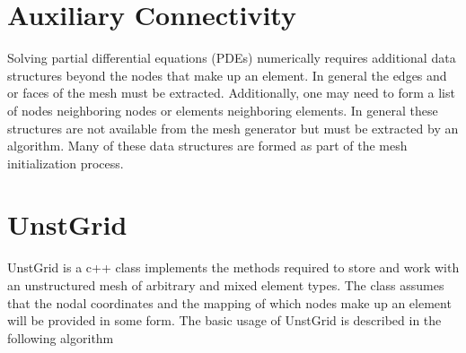 \documentclass[letterpaper]{article}
\begin{document}
\section{Auxiliary Connectivity}
Solving partial differential equations (PDEs) numerically requires additional data structures beyond the nodes that make up an element.  In general the edges and or faces of the mesh must be extracted.  Additionally, one may need to form a list of nodes neighboring nodes or elements neighboring elements.  In general these structures are not available from the mesh generator but must be extracted by an algorithm.  Many of these data structures are formed as part of the mesh initialization process.  


\section{UnstGrid}
UnstGrid is a c++ class implements the methods required to store and work with an unstructured mesh of arbitrary and mixed element types.  The class assumes that the nodal coordinates and the mapping of which nodes make up an element will be provided in some form.  The basic usage of UnstGrid is described in the following algorithm
\end{document}
